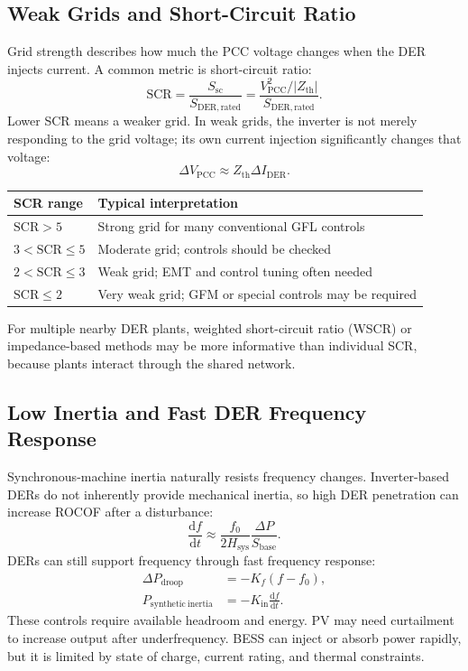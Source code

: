 \documentclass[11pt]{article}
\newcommand{\dd}{\mathrm{d}}
\begin{document}
\subsection{Weak Grids and Short-Circuit Ratio}
Grid strength describes how much the PCC voltage changes when the DER injects
current. A common metric is short-circuit ratio:
\begin{equation}
\mathrm{SCR}=\frac{S_{\mathrm{sc}}}{S_{\mathrm{DER,rated}}}
=\frac{V_{\mathrm{PCC}}^2/|Z_{\mathrm{th}}|}{S_{\mathrm{DER,rated}}}.
\end{equation}
Lower SCR means a weaker grid. In weak grids, the inverter is not merely
responding to the grid voltage; its own current injection significantly changes
that voltage:
\begin{equation}
\Delta V_{\mathrm{PCC}}\approx Z_{\mathrm{th}}\Delta I_{\mathrm{DER}}.
\end{equation}

\begin{center}
\begin{tabular}{ll}
\toprule
SCR range & Typical interpretation \\
\midrule
$\mathrm{SCR}>5$ & Strong grid for many conventional GFL controls \\
$3<\mathrm{SCR}\le 5$ & Moderate grid; controls should be checked \\
$2<\mathrm{SCR}\le 3$ & Weak grid; EMT and control tuning often needed \\
$\mathrm{SCR}\le 2$ & Very weak grid; GFM or special controls may be required \\
\bottomrule
\end{tabular}
\end{center}

For multiple nearby DER plants, weighted short-circuit ratio (WSCR) or
impedance-based methods may be more informative than individual SCR, because
plants interact through the shared network.

\subsection{Low Inertia and Fast DER Frequency Response}
Synchronous-machine inertia naturally resists frequency changes. Inverter-based
DERs do not inherently provide mechanical inertia, so high DER penetration can
increase ROCOF after a disturbance:
\begin{equation}
\frac{\dd f}{\dd t}\approx
\frac{f_0}{2H_{\mathrm{sys}}}\frac{\Delta P}{S_{\mathrm{base}}}.
\end{equation}
DERs can still support frequency through fast frequency response:
\begin{align}
\Delta P_{\mathrm{droop}}&=-K_f(f-f_0),\\
P_{\mathrm{synthetic\ inertia}}&=-K_{\mathrm{in}}\frac{\dd f}{\dd t}.
\end{align}
These controls require available headroom and energy. PV may need curtailment to
increase output after underfrequency. BESS can inject or absorb power rapidly,
but it is limited by state of charge, current rating, and thermal constraints.
\end{document}
